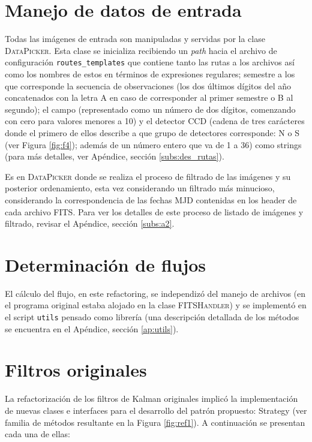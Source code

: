 \section{Manejo de datos de entrada}
Todas las im\'agenes de entrada son manipuladas y servidas por la clase \textsc{DataPicker}. Esta clase se inicializa recibiendo un \textit{path} hacia el archivo de configuraci\'on \texttt{routes\_templates} que contiene tanto las rutas a los archivos as\'i como los nombres de estos en t\'erminos de expresiones regulares; semestre a los que corresponde la secuencia de observaciones (los dos \'ultimos d\'igitos del a\~no concatenados con la letra A en caso de corresponder al primer semestre o B al segundo); el campo (representado como un n\'umero de dos d\'igitos, comenzando con cero para valores menores a 10) y el detector CCD (cadena de tres car\'acteres donde el primero de ellos describe a que grupo de detectores corresponde: N o S (ver Figura \ref{fig:f4}); adem\'as de un n\'umero entero que va de 1 a 36) como strings (para m\'as detalles, ver Ap\'endice, secci\'on \ref{subs:des_rutas}). 
\bigskip

Es en \textsc{DataPicker} donde se realiza el proceso de filtrado de las im\'agenes y su posterior ordenamiento, esta vez considerando un filtrado m\'as minucioso, considerando la correspondencia de las fechas MJD contenidas en los header de cada archivo FITS. Para ver los detalles de este proceso de listado de im\'agenes y filtrado, revisar el Ap\'endice, secci\'on \ref{subs:a2}.

\section{Determinaci\'on de flujos}
El c\'alculo del flujo, en este refactoring, se independiz\'o del manejo de archivos (en el programa original estaba alojado en la clase \textsc{FITSHandler}) y se implement\'o en el script \texttt{utils} pensado como librer\'ia (una descripci\'on detallada de los m\'etodos se encuentra en el Ap\'endice, secci\'on \ref{ap:utils}).
\bigskip

\section{Filtros originales}
La refactorizaci\'on de los filtros de Kalman originales implic\'o la implementaci\'on de nuevas clases e interfaces para el desarrollo del patr\'on propuesto: Strategy (ver familia de m\'etodos resultante en la Figura \ref{fig:ref1}). A continuaci\'on se presentan cada una de ellas:

